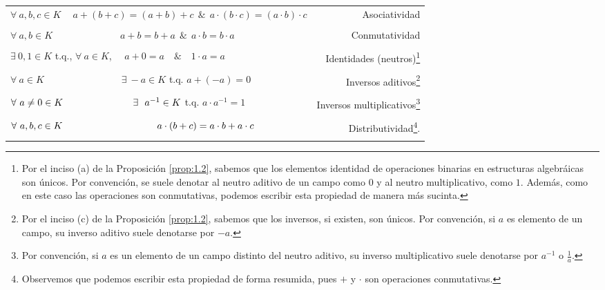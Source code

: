\documentclass[apuntes]{subfiles}
\begin{document}
\begin{tcolorbox}[breakable]
\begin{center}
\begin{tabular}{lr}
    \\
    $\forall \ a,b,c\in K \quad \ a+(b+c)=(a+b)+c \ \ \& \ \ a\cdot (b\cdot c)=(a\cdot b)\cdot c$ & Asociatividad \\ \\
    $\forall \ a,b\in K \quad \quad \quad \quad \quad \quad \quad a+b=b+a \ \ \& \ \ a\cdot b = b\cdot a$ & Conmutatividad \\ \\
    $\exists \ 0,1\in K$ t.q., $\forall \ a\in K$, \ \ \quad $a+0=a \quad \& \quad 1\cdot a=a$ & Identidades (neutros)\footnote{Por el inciso (a) de la Proposición \ref{prop:1.2}, sabemos que los elementos identidad de operaciones binarias en estructuras algebráicas son únicos. Por convención, se suele denotar al neutro aditivo de un campo como $0$ y al neutro multiplicativo, como $1$. Además, como en este caso las operaciones son conmutativas, podemos escribir esta propiedad de manera más sucinta.} \\ \\
    $\forall \ a\in K \quad \quad \quad \quad \quad \quad \quad \quad \exists \ -a\in K$ \quad t.q. \quad $a + (-a) = 0$ & Inversos aditivos\footnote{Por el inciso (c) de la Proposición \ref{prop:1.2}, sabemos que los inversos, si existen, son únicos. Por convención, si $a$ es elemento de un campo, su inverso aditivo suele denotarse por $-a$.} \\ \\
    $\forall \ a\neq0\in K \hspace{2.55cm} \exists \ \ a^{-1}\in K$ \quad t.q. \quad $a\cdot a^{-1}= 1$ & Inversos multiplicativos\footnote{Por convención, si $a$ es un elemento de un campo distinto del neutro aditivo, su inverso multiplicativo suele denotarse por $a^{-1}$ o $\frac{1}{a}$.} \\ \\
    $\forall \ a,b,c\in K \hspace{3.45cm}a\cdot (b+c) = a\cdot b+a\cdot c$ & Distributividad\footnote{Observemos que podemos escribir esta propiedad de forma resumida, pues $+$ y $\cdot$ son operaciones conmutativas.}.\\ \\
\end{tabular}
\end{center}
\end{tcolorbox}
\end{document}
